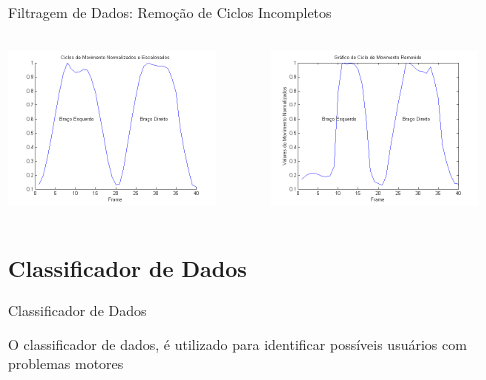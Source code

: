 \documentclass{beamer}
\begin{document}
\begin{frame}{Filtragem de Dados: Remoção de Ciclos Incompletos}
   \begin{block}{}
   
   \begin{columns}[c]
     \begin{column}{0.5\linewidth}
				\includegraphics[width=5.5cm]{img/ciclonormalizadoescalonado.png}
     \end{column}

     \begin{column}{0.55\linewidth}
				\includegraphics[width=5.5cm]{img/ciclomovimentoremovido.png}
    \end{column}
\end{columns}
\end{block}
\end{frame}

\subsection{Classificador de Dados}
\begin{frame}{Classificador de Dados}
\begin{block}{}
			O classificador de dados, é utilizado para identificar possíveis usuários com problemas motores
			
\end{block}
\end{frame}
\end{document}
